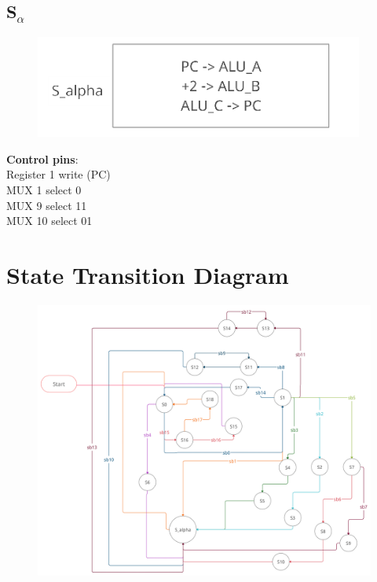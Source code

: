 \documentclass[11pt, fleqn]{article}
\begin{document}
\subsection*{S$_\alpha$}
\begin{figure}[H]
    \centering
    \includegraphics{DataPath/DataPath_S_alpha.PNG}
\end{figure}
\textbf{Control pins}: \\
Register 1 write (PC) \\
MUX 1 select 0 \\
MUX 9 select 11 \\
MUX 10 select 01 \\

\newpage
\section*{State Transition Diagram}
\begin{figure}[H]
    \centering
    \includegraphics[scale=0.12]{STG.png}
\end{figure}
\end{document}
